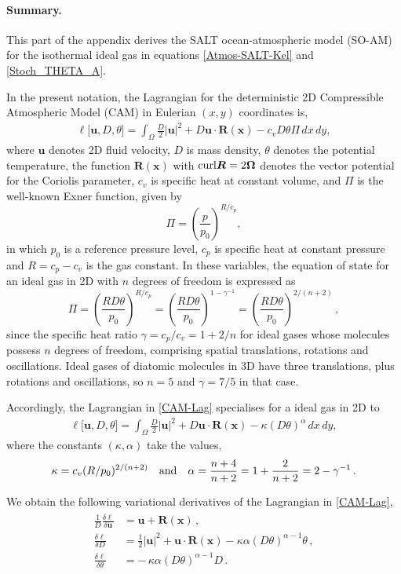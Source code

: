 \documentclass[11pt, oneside]{article}   	%
\numberwithin{equation}{section}
\theoremstyle{plain}
\theoremstyle{definition}
\theoremstyle{remark}
\newcommand{\<}{\langle}
\renewcommand{\>}{\rangle}
\newcommand{\dede}[2]{\frac{\delta {#1}}{\delta {#2}} }
\newcommand{\bs}[1]{\boldsymbol{#1}}
\begin{document}
\paragraph{Summary.}
This part of the appendix derives the SALT ocean-atmospheric model (SO-AM) for the isothermal ideal gas in equations \eqref{Atmos-SALT-Kel} and \eqref{Stoch_THETA_A}. \\ 	

In the present notation, the Lagrangian for the deterministic 2D Compressible Atmospheric
Model (CAM) in Eulerian $(x,y)$ coordinates is,
\begin{align}
\ell\big[\bs{u}, D,\theta \big] = 
\int_{\Omega} \frac{D}{2} |\bs{u}|^2 
+ D \bs{u}\cdot\bs{R}(\bs{x})
- c_vD\theta\Pi  \,dx\,dy,
\label{CAM-Lag}
\end{align}
where $\bs{u}$ denotes 2D fluid velocity, $D$ is mass density, $\theta$ denotes the potential temperature, 
the function $\bs{R}(\bs{x})$ with ${\rm curl} \bs{R}=2\bs{\Omega}$ denotes the vector potential for the Coriolis parameter, 
$c_v$ is specific heat at constant volume, and $\Pi$ is the well-known Exner function, given by
\[
\Pi = \left(
\frac{p}{p_0}
\right)^{R/c_p},
\]
in which  $p_0$ is a reference pressure level, $c_p$ is specific heat at constant pressure and $R=c_p-c_v$ is the gas
constant. In these variables, the equation of state for an ideal gas in 2D with $n$ degrees of freedom is expressed as
\[
\Pi = \left(\frac{RD\theta}{p_0}\right)^{R/c_p} = \left(\frac{RD\theta}{p_0}\right)^{1-\gamma^{-1}}
= \left(\frac{RD\theta}{p_0}\right)^{2/(n+2)}
\,,
\]
since the specific heat ratio $\gamma=c_p/c_v = 1+2/n$ for ideal gases whose molecules possess $n$ degrees of freedom,   
comprising spatial translations, rotations and oscillations. Ideal gases of diatomic molecules in 3D have three translations, 
plus rotations and oscillations, so $n=5$ and $\gamma=7/5$ in that case.

Accordingly, the Lagrangian in \eqref{CAM-Lag} specialises for a ideal gas in 2D to 
\begin{align}
\ell\big[\bs{u}, D,\theta \big] = 
\int_{\Omega} \frac{D}{2} |\bs{u}|^2 
+ D \bs{u}\cdot\bs{R}(\bs{x})
- \kappa (D\theta)^\alpha  \,dx\,dy,
\label{2DAM-Lag}
\end{align}
where the constants $(\kappa,\alpha)$ take the values, 
\[
\kappa=c_v (R/p_0)^{2/(n+2)} 
\quad\hbox{and}\quad
\alpha = \frac{n+4}{n+2} = 1 + \frac{2}{n+2} = 2 -\gamma^{-1}
\,.
\]

We obtain the following variational derivatives of the Lagrangian in \eqref{CAM-Lag},
\begin{align}
\begin{split}
\frac1D\dede{\ell}{\bs{u}}  &=  \bs{u} + \bs{R}(\bs{x})
\,, \\
\dede{\ell}{D} & =  \frac{1}{2} |\bs{u}|^2 +  \bs{u}\cdot\bs{R}(\bs{x}) - \kappa\alpha(D\theta)^{\alpha-1}\theta \,, \\
\dede{\ell}{\theta}  &= -\, \kappa\alpha(D\theta)^{\alpha-1}D
\,.
\end{split}
\label{CAM-Lag-vars}
\end{align}
\end{document}
